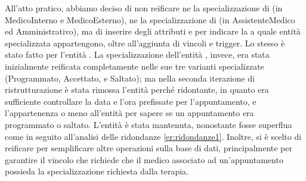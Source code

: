 \documentclass[11pt]{article}
\begin{document}
All'atto pratico, abbiamo deciso di non reificare ne la specializzazione di  (in MedicoInterno e MedicoEsterno), ne la specializzazione di  (in AssistenteMedico ed Amministrativo), ma di inserire degli attributi  e  per indicare la a quale entità specializzata appartengono, oltre all'aggiunta di vincoli e trigger. Lo stesso è stato fatto per l'entità .
La specializzazione dell'entità , invece, era stata inizialmente reificata completamente nelle sue tre varianti specializzate (Programmato, Accettato, e Saltato); ma nella seconda iterazione di ristrutturazione è stata rimossa l'entità  perché ridontante, in quanto era sufficiente controllare la data e l'ora prefissate per l'appuntamento, e l'appartenenza o meno all'entità  per sapere se un appuntamento era programmato o saltato. L'entità  è stata mantenuta, nonostante fosse superflua come  in seguito all'analisi delle ridondanze \ref{er:ridondanze1}. Inoltre, si è scelto di reificare  per semplificare altre operazioni sulla base di dati, principalmente per garantire il vincolo che richiede che il medico associato ad un'appuntamento possieda la specializzazione richiesta dalla terapia.
\end{document}
